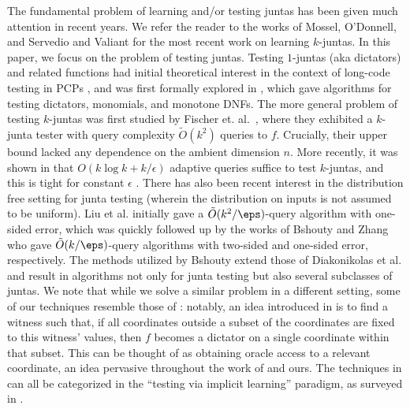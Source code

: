 The fundamental problem of learning and/or testing juntas has been given much attention in recent years. We refer the reader to the works of Mossel, O'Donnell, and Servedio \cite{learning-juntas-MOS} and Valiant \cite{Valiant-learning-juntas} for the most recent work on learning $k$-juntas. 
In this paper, we focus on the problem of testing juntas. Testing $1$-juntas (aka dictators) and related functions had initial theoretical interest in the context of long-code testing in PCPs \cite{hastad-inapproximability, BellareGS98}, and was first formally explored in \cite{ParnasRS01}, which gave algorithms for testing dictators, monomials, and monotone DNFs. 
The more general problem of testing $k$-juntas was first studied by Fischer et. al.~\cite{FischerKRSS04}, where they exhibited a $k$-junta tester with query complexity $\tilde{O}(k^2)$ queries to $f$. Crucially, their upper bound lacked any dependence on the ambient dimension $n$. 
More recently, it was shown in \cite{og-junta-testing} that $O(k \log k + k/\epsilon)$ adaptive queries suffice to test $k$-juntas, and this is tight for constant $\epsilon$ \cite{saglam18-juntatestlb, DBLP:journals/ipl/ChocklerG04}. 
There has also been recent interest in the distribution free setting for junta testing (wherein the distribution on inputs is not assumed to be uniform). 
Liu et al. \cite{DBLP:journals/talg/LiuCSSX19-dist-free} initially gave a $\tilde{O}(k^2/\eps)$-query algorithm with one-sided error, which was quickly followed up by the works of Bshouty \cite{DBLP:conf/coco/Bshouty19} and Zhang \cite{DBLP:zhang-dist-free-mab-2019} who gave $\tilde{O}(k/\eps)$-query algorithms with two-sided and one-sided error, respectively. 
The methods utilized by Bshouty extend those of Diakonikolas et al. \cite{DBLP:conf/focs/DiakonikolasLMORSW07} and result in algorithms not only for junta testing but also several subclasses of juntas. We note that while we solve a similar problem in a different setting, some of our techniques resemble those of \cite{DBLP:conf/coco/Bshouty19}: notably, an idea introduced in \cite{DBLP:conf/coco/Bshouty19} is to find a witness such that, if all coordinates outside a subset of the coordinates are fixed to this witness' values, then $f$ becomes a dictator on a single coordinate within that subset. This can be thought of as obtaining oracle access to a relevant coordinate, an idea pervasive throughout the work of \cite{junta-coordinate-oracles} and ours. The techniques in \cite{DBLP:conf/focs/DiakonikolasLMORSW07, DBLP:conf/icalp/DiakonikolasLMSW08, DBLP:conf/coco/Bshouty19} can all be categorized in the ``testing via implicit learning'' paradigm, as surveyed in \cite{DBLP:conf/propertytesting/Servedio10}.  
%


